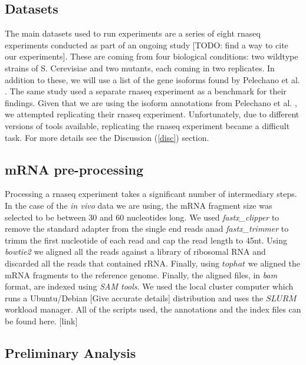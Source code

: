 \documentclass[12pt]{article}
\begin{document}
\subsection{Datasets}

The main datasets used to run experiments are a series of eight \acrshort{rnaseq} experiments conducted as part of an ongoing study {\tiny[TODO: find a way to cite our experiments]}. These are coming from four biological conditions: two wildtype strains of S. Cerevisiae and two mutants, each coming in two replicates. In addition to these, we will use a list of the gene isoforms found by Pelechano et al. \cite{Pelechano2013}. The same study \cite{Pelechano2013} used a separate \cite{Wilkening2013}  \acrshort{rnaseq} experiment as a benchmark for their findings. Given that we are using the isoform annotations from Pelechano et al. \cite{Pelechano2013}, we attempted replicating their \acrshort{rnaseq} experiment. Unfortunately, due to different versions of tools available, replicating the \acrshort{rnaseq} experiment became a difficult task. For more details see the Discussion (\ref{disc}) section. 

\subsection{mRNA pre-processing}
Processing a \acrshort{rnaseq} experiment takes a significant number of intermediary steps. In the case of the \textit{in vivo} data we are using, the mRNA fragment size was selected to be between 30 and 60 nucleotides long. We used \textit{fastx\_clipper} to remove the standard adapter from the single end reads anad \textit{fastx\_trimmer}  to trimm the first nucleotide of each read and cap the read length to 45nt. Using \textit{bowtie2} we aligned all the reads against a library of ribosomal RNA and discarded all the reads that  contained rRNA. Finally, using $tophat$ we aligned the mRNA fragments to the reference genome. Finally, the aligned files, in \textit{bam} format, are indexed using \textit{SAM tools}. We used the local cluster computer which runs a Ubuntu/Debian [Give accurate details] distribution and uses the $SLURM$ workload manager. All of the scripts used, the annotations and the index files can be found here. [link]




\subsection{Preliminary Analysis}
\end{document}
